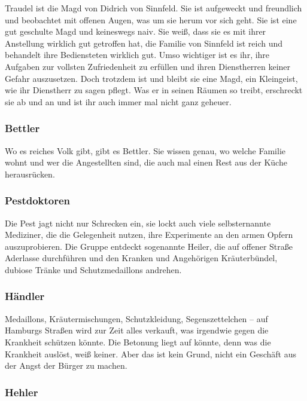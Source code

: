 Traudel ist die Magd von Didrich von Sinnfeld. Sie ist aufgeweckt und freundlich und beobachtet mit offenen Augen, was um sie herum vor sich geht. Sie ist eine gut geschulte Magd und keineswegs naiv. Sie weiß, dass sie es mit ihrer Anstellung wirklich gut getroffen hat, die Familie von Sinnfeld ist reich und behandelt ihre Bediensteten wirklich gut. Umso wichtiger ist es ihr, ihre Aufgaben zur vollsten Zufriedenheit zu erfüllen und ihren Dienstherren keiner Gefahr auszusetzen. Doch trotzdem ist und bleibt sie eine Magd, ein Kleingeist, wie ihr Dienstherr zu sagen pflegt. Was er in seinen Räumen so treibt, erschreckt sie ab und an und ist ihr auch immer mal nicht ganz geheuer.

\subsubsection*{Bettler}
\label{Bettler}

Wo es reiches Volk gibt, gibt es Bettler. Sie wissen genau, wo welche Familie wohnt und wer die Angestellten sind, die auch mal einen Rest aus der Küche herausrücken.

\subsubsection*{Pestdoktoren}
\label{Pestdoktoren}

Die Pest jagt nicht nur Schrecken ein, sie lockt auch viele selbsternannte Mediziner, die die Gelegenheit nutzen, ihre Experimente an den armen Opfern auszuprobieren. Die Gruppe entdeckt sogenannte Heiler, die auf offener Straße Aderlasse durchführen und den Kranken und Angehörigen Kräuterbündel, dubiose Tränke und Schutzmedaillons andrehen.

\subsubsection*{Händler}
\label{Händler}

Medaillons, Kräutermischungen, Schutzkleidung, Segenszettelchen – auf Hamburgs Straßen wird zur Zeit alles verkauft, was irgendwie gegen die Krankheit schützen könnte. Die Betonung liegt auf könnte, denn was die Krankheit auslöst, weiß keiner. Aber das ist kein Grund, nicht ein Geschäft aus der Angst der Bürger zu machen.

\subsubsection*{Hehler}
\label{Hehler}

